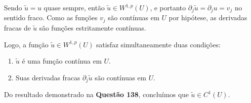 \documentclass[cs_edp_2026.1.tex]{subfiles} %
\begin{document}
{	Sendo $\tilde{u} = u$ quase sempre, então $\tilde{u} \in W^{1,p}(U)$, e portanto $\partial_j \tilde{u} = \partial_j u = v_j$ no sentido fraco. Como as funções $v_j$ são contínuas em $U$ por hipótese, as derivadas fracas de $\tilde{u}$ são funções estritamente contínuas.
	
	Logo, a função $\tilde{u} \in W^{1,p}(U)$ satisfaz simultaneamente duas condições:
	\begin{enumerate}
		\item $\tilde{u}$ é uma função contínua em $U$.
		\item Suas derivadas fracas $\partial_j \tilde{u}$ são contínuas em $U$.
	\end{enumerate}
	
	Do resultado demonstrado na \textbf{Questão 138}, concluímos que $\tilde{u} \in C^1(U)$.
}

\end{document}
